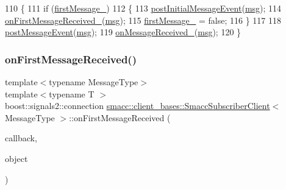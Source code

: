 \begin{DoxyCode}
110   \{
111     \textcolor{keywordflow}{if} (\hyperlink{classsmacc_1_1client__bases_1_1SmaccSubscriberClient_a1283e89a0d33a9028a5042519c6869a6}{firstMessage\_})
112     \{
113       \hyperlink{classsmacc_1_1client__bases_1_1SmaccSubscriberClient_ac184f4c0a6e924ceb9eecc71d6252106}{postInitialMessageEvent}(\hyperlink{namespacebattery__monitor__node_ab1920c64448816edd4064e494275fdff}{msg});
114       \hyperlink{classsmacc_1_1client__bases_1_1SmaccSubscriberClient_af1ec022065a2df3faabe40768f8b2e22}{onFirstMessageReceived\_}(\hyperlink{namespacebattery__monitor__node_ab1920c64448816edd4064e494275fdff}{msg});
115       \hyperlink{classsmacc_1_1client__bases_1_1SmaccSubscriberClient_a1283e89a0d33a9028a5042519c6869a6}{firstMessage\_} = \textcolor{keyword}{false};
116     \}
117 
118     \hyperlink{classsmacc_1_1client__bases_1_1SmaccSubscriberClient_ad71ae0708e8a3ea321de985076d8b0ac}{postMessageEvent}(\hyperlink{namespacebattery__monitor__node_ab1920c64448816edd4064e494275fdff}{msg});
119     \hyperlink{classsmacc_1_1client__bases_1_1SmaccSubscriberClient_a04469577ec95e2f6c04cd4dca87dfc08}{onMessageReceived\_}(\hyperlink{namespacebattery__monitor__node_ab1920c64448816edd4064e494275fdff}{msg});
120   \}
\end{DoxyCode}
\mbox{\label{classsmacc_1_1client__bases_1_1SmaccSubscriberClient_a3f6dc8ef86f21f401204182778cc584d}} 
\subsubsection{\texorpdfstring{on\+First\+Message\+Received()}{onFirstMessageReceived()}}
{\footnotesize\ttfamily template$<$typename Message\+Type$>$ \\
template$<$typename T $>$ \\
boost\+::signals2\+::connection \hyperlink{classsmacc_1_1client__bases_1_1SmaccSubscriberClient}{smacc\+::client\+\_\+bases\+::\+Smacc\+Subscriber\+Client}$<$ Message\+Type $>$\+::on\+First\+Message\+Received (\begin{DoxyParamCaption}\item[{void(T\+::$\ast$)(const Message\+Type \&)}]{callback,  }\item[{T $\ast$}]{object }\end{DoxyParamCaption})\hspace{0.3cm}{\ttfamily [inline]}}



